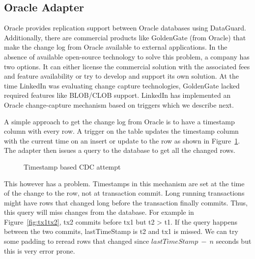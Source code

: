\subsection{Oracle Adapter}

Oracle provides replication support between Oracle databases using DataGuard. Additionally, there are commercial products like GoldenGate (from Oracle) that make the change log from Oracle available to external applications. In the absence of available open-source technology to solve this problem, a company has two options. It can either license the commercial solution with the associated fees and feature availability or try to develop and support its own solution. At the time LinkedIn was evaluating change capture technologies, GoldenGate lacked required features like BLOB/CLOB support. LinkedIn has implemented an Oracle change-capture mechanism based on triggers which we describe next.

A simple approach to get the change log from Oracle is to have a timestamp column with every row. A trigger on the table updates the timestamp column with the current time on an insert or update to the row as shown in Figure~\ref{fig:Tablewithtimestamp}. The adapter then issues a query to the database to get all the changed rows.

\begin{figure}
\centering
{}
\vspace*{-2ex}
\caption{Timestamp based CDC attempt}
\label{fig:Tablewithtimestamp}
\vspace*{-2ex}
\end{figure}

This however has a problem. Timestamps in this mechanism are set at the time of the change to the row, not at transaction commit. Long running transactions might have rows that changed long before the transaction finally commits. Thus, this query will miss changes from the database. For example in Figure~\ref{fig:tx1tx2}, tx2 commits before tx1 but t2 > t1. If the query happens between the two commits, lastTimeStamp is t2 and tx1 is missed. We can try some padding to reread rows that changed since $lastTimeStamp~-~n$ seconds but this is very error prone.

